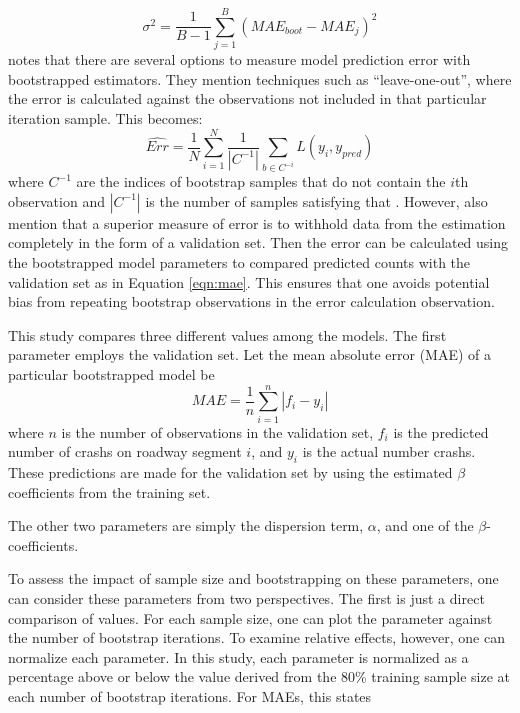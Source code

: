 \documentclass[titlepage,12pt,times,nopageno]{article}
\begin{document}
\begin{equation}
\sigma^2=\frac{1}{B-1}\sum_{j=1}^B (MAE_{boot}-MAE_j)^2 \label{eqn:varboot}
\end{equation}
\citet{hastie2001esl} notes that there are several options to measure model prediction error with bootstrapped estimators.  They mention techniques such as ``leave-one-out'', where the error is calculated against the observations not included in that particular iteration sample.  This becomes:
\begin{equation}
\widehat{Err}=\frac{1}{N}\sum_{i=1}^N \frac{1}{|C^{-1}|}\sum_{b\in C^{-i}}L(y_i,y_{pred}) \label{eqn:errboot}
\end{equation}
where $C^{-1}$ are the indices of bootstrap samples that do not contain the $i$th observation and $|C^{-1}|$ is the number of samples satisfying that \citep{hastie2001esl}.  However, \citet{hastie2001esl} also mention that a superior measure of error is to withhold data from the estimation completely in the form of a validation set.  Then the error can be calculated using the bootstrapped model parameters to compared predicted counts with the validation set as in Equation \ref{eqn:mae}.  This ensures that one avoids potential bias from repeating bootstrap observations in the error calculation observation.\par
This study compares three different values among the models.   The first parameter employs the validation set.  Let the mean absolute error (MAE) of a particular bootstrapped model be
\begin{equation}
MAE=\frac{1}{n}\sum_{i=1}^n \left| f_i-y_i\right| \label{eqn:mae}
\end{equation}
where $n$ is the number of observations in the validation set, $f_i$ is the predicted number of crashs on roadway segment $i$, and $y_i$ is the actual number crashs.  These predictions are made for the validation set by using the estimated $\beta$ coefficients from the training set.\par
The other two parameters are simply the dispersion term, $\alpha$, and one of the $\beta$-coefficients.\par
To assess the impact of sample size and bootstrapping on these parameters, one can consider these parameters from two perspectives.  The first is just a direct comparison of values.  For each sample size, one can plot the parameter against the number of bootstrap iterations.  To examine relative effects, however, one can normalize each parameter.  In this study, each parameter is normalized as a percentage above or below the value derived from the 80\% training sample size at each number of bootstrap iterations.  For MAEs, this states
\end{document}
